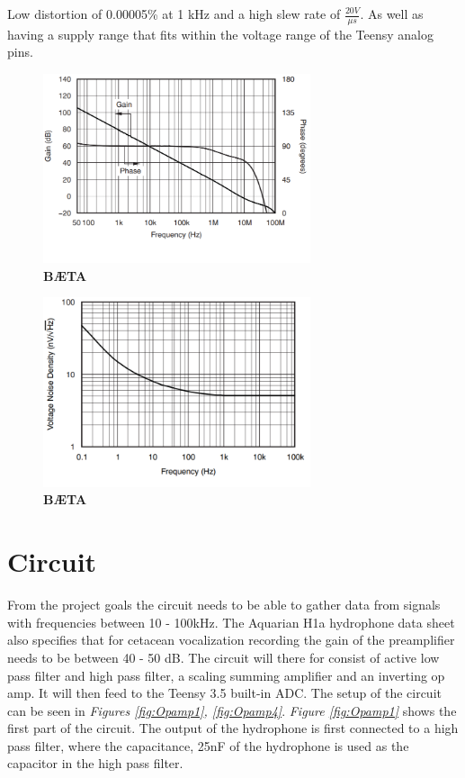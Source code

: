 Low distortion of 0.00005\% at 1 kHz and a high slew rate of $\frac{20V}{\mu s}$.
As well as having a supply range that fits within the voltage range of the Teensy analog pins.
\cite{noauthor_opa164x_nodate}

\begin{figure}[h]
    \centering
    \includegraphics[width=0.7\textwidth]{graphics/dbVsfreq.png}
    \caption{\textbf{BÆTA}}
    \label{fig:dbvsFreq}
\end{figure}

\begin{figure}[h]
    \centering
    \includegraphics[width=0.7\textwidth]{graphics/noiseDensvsFreq.png}
    \caption{\textbf{BÆTA}}
    \label{fig:noiseDensvsFreq}
\end{figure}

\section{Circuit}

From the project goals the circuit needs to be able to gather data from signals with frequencies between 10 - 100kHz. 
The Aquarian H1a hydrophone data sheet also specifies that for cetacean vocalization recording the gain of the preamplifier needs to be between 40 - 50 dB.
The circuit will there for consist of active low pass filter and high pass filter, a scaling summing amplifier and an inverting op amp.
It will then feed to the Teensy 3.5 built-in ADC.
The setup of the circuit can be seen in \textit{Figures \ref{fig:Opamp1}, \ref{fig:Opamp4}}.
\textit{Figure \ref{fig:Opamp1}} shows the first part of the circuit.
The output of the hydrophone is first connected to a high pass filter, where the capacitance, 25nF of the hydrophone is used as the capacitor in the high pass filter.

